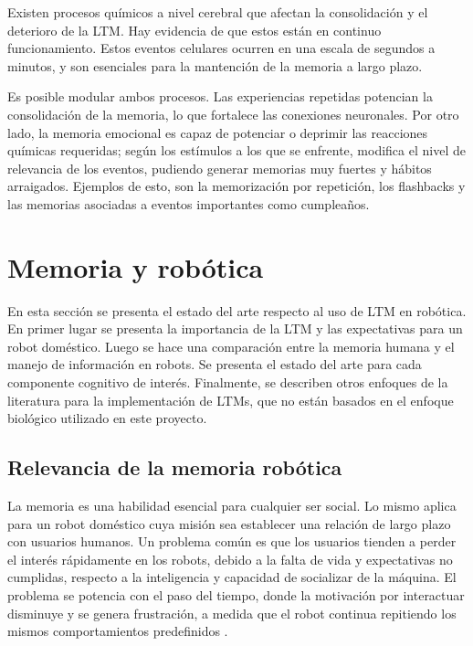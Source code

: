 Existen procesos químicos a nivel cerebral que afectan la consolidación y el deterioro de la LTM. Hay evidencia de que estos están en continuo funcionamiento. Estos eventos celulares ocurren en una escala de segundos a minutos, y son esenciales para la mantención de la memoria a largo plazo.

Es posible modular ambos procesos. Las experiencias repetidas potencian la consolidación de la memoria, lo que fortalece las conexiones neuronales. Por otro lado, la memoria emocional es capaz de potenciar o deprimir las reacciones químicas requeridas; según los estímulos a los que se enfrente, modifica el nivel de relevancia de los eventos, pudiendo generar memorias muy fuertes y hábitos arraigados. Ejemplos de esto, son la memorización por repetición, los flashbacks y las memorias asociadas a eventos importantes como cumpleaños.


\section{Memoria y robótica}

En esta sección se presenta el estado del arte respecto al uso de LTM en robótica. En primer lugar se presenta la importancia de la LTM y las expectativas para un robot doméstico. Luego se hace una comparación entre la memoria humana y el manejo de información en robots.  Se presenta el estado del arte para cada componente cognitivo de interés. Finalmente, se describen otros enfoques de la literatura para la implementación de LTMs, que no están basados en el enfoque biológico utilizado en este proyecto.


\subsection{Relevancia de la memoria robótica}

La memoria es una habilidad esencial para cualquier ser social. Lo mismo aplica para un robot doméstico cuya misión sea establecer una relación de largo plazo con usuarios humanos. Un problema común es que los usuarios tienden a perder el interés rápidamente en los robots, debido a la falta de vida y expectativas no cumplidas, respecto a la inteligencia y capacidad de socializar de la máquina. El problema se potencia con el paso del tiempo, donde la motivación por interactuar disminuye y se genera frustración, a medida que el robot continua repitiendo los mismos comportamientos predefinidos \cite{Ho2009}.


